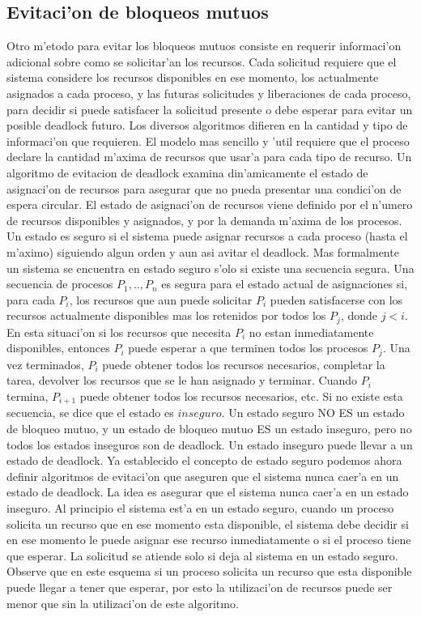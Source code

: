 \subsection{Evitaci'on de bloqueos mutuos}
Otro m'etodo para evitar los bloqueos mutuos consiste en requerir informaci'on adicional sobre como se solicitar'an los recursos. Cada solicitud requiere que el sistema considere los recursos disponibles en ese momento, los actualmente asignados a cada proceso, y las futuras solicitudes y liberaciones de cada proceso, para decidir si puede satisfacer la solicitud presente o debe esperar para evitar un posible deadlock futuro.
Los diversos algoritmos difieren en la cantidad y tipo de informaci'on que requieren. El modelo mas sencillo y 'util requiere que el proceso declare la cantidad m'axima de recursos que usar'a para cada tipo de recurso. Un algoritmo de evitacion de deadlock examina din'amicamente el estado de asignaci'on de recursos para asegurar que no pueda presentar una condici'on de espera circular. El estado de asignaci'on de recursos viene definido por el n'umero de recursos disponibles y asignados, y por la demanda m'axima de los procesos. Un estado es seguro si el sistema puede asignar recursos a cada proceso (hasta el m'aximo) siguiendo algun orden y aun asi avitar el deadlock. Mas formalmente un sistema se encuentra en estado seguro s'olo si existe una secuencia segura. Una secuencia de procesos $P_{1},..,P_{n}$ es segura para el estado actual de asignaciones si, para cada $P_{i}$, los recursos que aun puede solicitar $P_{i}$ pueden satisfacerse con los recursos actualmente disponibles mas los retenidos por todos los $P_{j}$, donde $j<i$. En esta situaci'on si los recursos que necesita $P_{i}$ no estan inmediatamente disponibles, entonces $P_{i}$ puede esperar a que terminen todos los procesos $P_{j}$. Una vez terminados, $P_{i}$ puede obtener todos los recursos necesarios, completar la tarea, devolver los recursos que se le han asignado y terminar. Cuando $P_{i}$ termina, $P_{i+1}$ puede obtener todos los recursos necesarios, etc. Si no existe esta secuencia, se dice que el estado es $inseguro$.
Un estado seguro NO ES un estado de bloqueo mutuo, y un estado de bloqueo mutuo ES un estado inseguro, pero no todos los estados inseguros son de deadlock. Un estado inseguro puede llevar a un estado de deadlock.
Ya establecido el concepto de estado seguro podemos ahora definir algoritmos de evitaci'on que aseguren que el sistema nunca caer'a en un estado de deadlock. La idea es asegurar que el sistema nunca caer'a en un estado inseguro. Al principio el sistema est'a en un estado seguro, cuando un proceso solicita un recurso que en ese momento esta disponible, el sistema debe decidir si en ese momento le puede asignar ese recurso inmediatamente o si el proceso tiene que esperar. La solicitud se atiende solo si deja al sistema en un estado seguro.
Observe que en este esquema si un proceso solicita un recurso que esta disponible puede llegar a tener que esperar, por esto la utilizaci'on de recursos puede ser menor que sin la utilizaci'on de este algoritmo.

